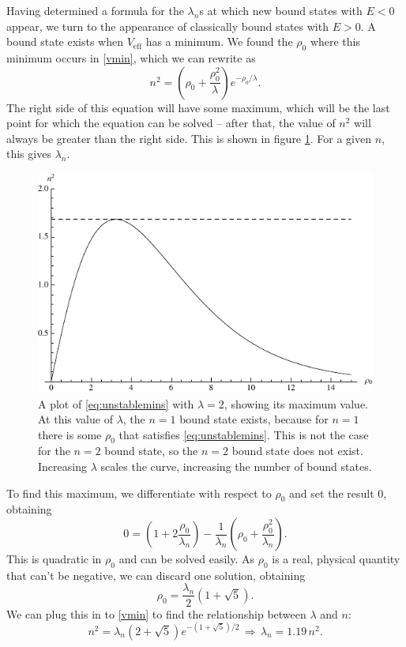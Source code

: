 \documentclass[12pt,twoside]{reedthesis}
\begin{document}
Having determined a formula for the $\lambda_n$s at which new bound states with $E < 0$ appear, we turn to the appearance of classically bound states with $E > 0$. A bound state exists when $V_{\mathrm{eff}}$ has a minimum. We found the $\rho_0$ where this minimum occurs in \eqref {vmin}, which we can rewrite as
\begin{equation}
n^2 = \left( \rho_0 + \frac{\rho_0^2}{\lambda} \right) e^{-\rho_0/\lambda}\mbox{.}
\label{eq:unstablemins}
\end{equation}
The right side of this equation will have some maximum, which will be the last point for which the equation can be solved -- after that, the value of $n^2$ will always be greater than the right side. This is shown in figure \ref{fig:unstableveff}. For a given $n$, this gives $\lambda_n$.
\begin{figure}[h]
	\centering
	\includegraphics[scale=0.95]{Figures/unstableveff}
	\caption[$n^2$ as a function of $\rho_0$]{A plot of \eqref{eq:unstablemins} with $\lambda = 2$, showing its maximum value. At this value of $\lambda$, the $n = 1$ bound state exists, because for $n = 1$ there is some $\rho_0$ that satisfies \eqref{eq:unstablemins}. This is not the case for the $n = 2$ bound state, so the $n = 2$ bound state does not exist. Increasing $\lambda$ scales the curve, increasing the number of bound states.}
	\label{fig:unstableveff}
\end{figure}

To find this maximum, we differentiate with respect to $\rho_0$ and set the result 0, obtaining
\begin{equation}
0 = (1+2 \frac{\rho_0}{\lambda_n}) - \frac{1}{\lambda_n}(\rho_0 + \frac{\rho_0^2}{\lambda_n})\mbox{.} 
\end{equation}
This is quadratic in $\rho_0$ and can be solved easily.
As $\rho_0$ is a real, physical quantity that can't be negative, we can discard one solution, obtaining
\begin{equation}
\rho_0 = \frac{\lambda_n}{2}(1+\sqrt{5})\mbox{.}
\end{equation}
We can plug this in to \eqref{vmin} to find the relationship between $\lambda$ and $n$:
\begin{equation}
n^2 = \lambda_{n}(2 + \sqrt{5})e^{-(1+ \sqrt{5})/2}\, \Rightarrow \, \lambda_n =  1.19\, n^2\mbox{.}
\label{eq:unstable}
\end{equation}
\end{document}
